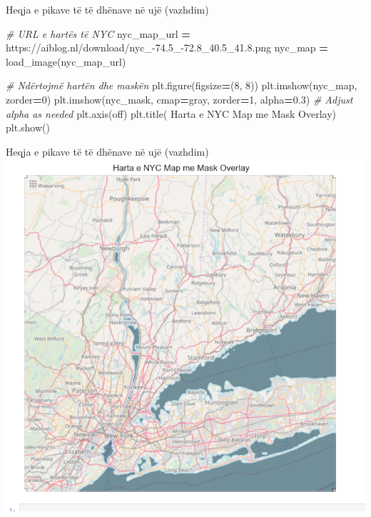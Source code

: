 \documentclass[
  ignorenonframetext,
]{beamer}
\newenvironment{Shaded}{\begin{snugshade}}{\end{snugshade}}
\newcommand{\CommentTok}[1]{\textcolor[rgb]{0.56,0.35,0.01}{\textit{#1}}}
\newcommand{\DecValTok}[1]{\textcolor[rgb]{0.00,0.00,0.81}{#1}}
\newcommand{\FloatTok}[1]{\textcolor[rgb]{0.00,0.00,0.81}{#1}}
\newcommand{\NormalTok}[1]{#1}
\newcommand{\OperatorTok}[1]{\textcolor[rgb]{0.81,0.36,0.00}{\textbf{#1}}}
\newcommand{\StringTok}[1]{\textcolor[rgb]{0.31,0.60,0.02}{#1}}
\begin{document}
\begin{frame}[fragile]{Heqja e pikave të të dhënave në ujë (vazhdim)}
\protect\hypertarget{heqja-e-pikave-tuxeb-tuxeb-dhuxebnave-nuxeb-ujuxeb-vazhdim}{}

\begin{Shaded}
\begin{Highlighting}[]
\CommentTok{\# URL e hartës të NYC}
\NormalTok{nyc\_map\_url }\OperatorTok{=} \StringTok{\textquotesingle{}https://aiblog.nl/download/nyc\_{-}74.5\_{-}72.8\_40.5\_41.8.png\textquotesingle{}}
\NormalTok{nyc\_map }\OperatorTok{=}\NormalTok{ load\_image(nyc\_map\_url)}

\CommentTok{\# Ndërtojmë hartën dhe maskën}
\NormalTok{plt.figure(figsize}\OperatorTok{=}\NormalTok{(}\DecValTok{8}\NormalTok{, }\DecValTok{8}\NormalTok{))}
\NormalTok{plt.imshow(nyc\_map, zorder}\OperatorTok{=}\DecValTok{0}\NormalTok{)}
\NormalTok{plt.imshow(nyc\_mask, cmap}\OperatorTok{=}\StringTok{\textquotesingle{}gray\textquotesingle{}}\NormalTok{, zorder}\OperatorTok{=}\DecValTok{1}\NormalTok{, alpha}\OperatorTok{=}\FloatTok{0.3}\NormalTok{)  }\CommentTok{\# Adjust \textasciigrave{}alpha\textasciigrave{} as needed}
\NormalTok{plt.axis(}\StringTok{\textquotesingle{}off\textquotesingle{}}\NormalTok{)}
\NormalTok{plt.title(}\StringTok{\textquotesingle{} Harta e NYC Map me Mask Overlay\textquotesingle{}}\NormalTok{)}
\NormalTok{plt.show()}
\end{Highlighting}
\end{Shaded}
\end{frame}

\begin{frame}{Heqja e pikave të të dhënave në ujë (vazhdim)}
\protect\hypertarget{heqja-e-pikave-tuxeb-tuxeb-dhuxebnave-nuxeb-ujuxeb-vazhdim-1}{}
\includegraphics{./Figs/train14.png}
\end{frame}
\end{document}
